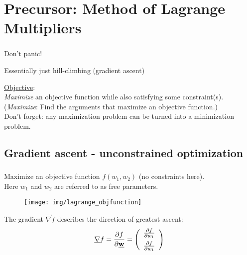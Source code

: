 \section{Precursor: Method of Lagrange Multipliers}


\begin{frame}\frametitle{\secname} 
    \begin{center}
    \slidesonly{\huge}
	Don't panic!
    \end{center}
    \begin{center}
        Essentially just hill-climbing (gradient ascent)
    \end{center}
    \pause

\underline{Objective}: \\
\textit{Maximize} an objective function while also satisfying some constraint(s).\\
{
\small(\textit{Maximize}: Find the arguments that maximize an objective function.)
}\\[5mm]
Don't forget: any maximization problem can be turned into a minimization problem.
\end{frame}

\subsection{Gradient ascent - unconstrained optimization}
\begin{frame}\frametitle{\subsecname}
Maximize an objective function $f(w_1, w_2)$ (no constraints here).\\
Here $w_1$ and $w_2$ are referred to as free parameters.\\

\begin{figure}[h]
	\centering
	\texttt{[image: img/lagrange\_objfunction]}%
    \label{fig:unconstrained}%
\end{figure}


\slidesonly{
\vspace{-3mm}
}

The gradient $\vec \nabla f$ describes the direction of greatest ascent:\\
\slidesonly{
\vspace{-3mm}
}
\begin{equation}
\underline{\mathbf{\nabla}} f = 
\frac{\partial f}{\partial \underline{\mathbf{w}}} = 
\left( \begin{array}{rrrrrrrrrrrrrrrrrrrrrrrrrr} \frac{\partial f}{\partial w_1} \\[0.2cm] \frac{\partial f}{\partial w_1} \\ \end{array} \right)
\end{equation}

\end{frame}

